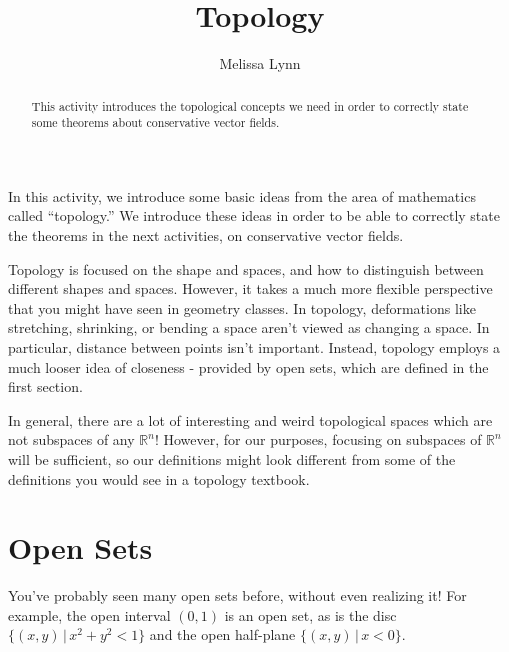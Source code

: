 \documentclass{ximera}
\title{Topology}
\author{Melissa Lynn}
\begin{document}
  
\begin{abstract}  
This activity introduces the topological concepts we need in order to correctly state some theorems about conservative vector fields. 
\end{abstract}  
\maketitle

In this activity, we introduce some basic ideas from the area of mathematics called ``topology.'' We introduce these ideas in order to be able to correctly state the theorems in the next activities, on conservative vector fields.

Topology is focused on the shape and spaces, and how to distinguish between different shapes and spaces. However, it takes a much more flexible perspective that you might have seen in geometry classes. In topology, deformations like stretching, shrinking, or bending a space aren't viewed as changing a space. In particular, distance between points isn't important. Instead, topology employs a much looser idea of closeness - provided by open sets, which are defined in the first section.

In general, there are a lot of interesting and weird topological spaces which are not subspaces of any $\mathbb{R}^n$! However, for our purposes, focusing on subspaces of $\mathbb{R}^n$ will be sufficient, so our definitions might look different from some of the definitions you would see in a topology textbook. 

\section{Open Sets}

You've probably seen many open sets before, without even realizing it! For example, the open interval $(0,1)$ is an open set, as is the disc $\{(x,y)\,|\,x^2+y^2<1\}$ and the open half-plane $\{(x,y)\,|\,x<0\}$.
\end{document}
